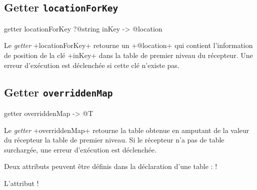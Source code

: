 \subsection{Getter \texttt{locationForKey}}

\begin{galgas}
getter locationForKey ?@string inKey -> @location
\end{galgas}


Le \emph{getter} \ggs+locationForKey+ retourne un \ggs+@location+ qui contient l'information de position de la clé \ggs+inKey+ dans la table de premier niveau du récepteur. Une erreur d'exécution est déclenchée si cette clé n'existe pas.








\subsection{Getter \texttt{overriddenMap}}

\begin{galgas}
getter overriddenMap -> @T
\end{galgas}


Le \emph{getter} \ggs+overriddenMap+ retourne la table obtenue en amputant de la valeur du récepteur la table de premier niveau. Si le récepteur n'a pas de table surchargée, une erreur d'exécution est déclenchée.










Deux attributs peuvent être définis dans la déclaration d'une table : \ggs!%

L'attribut \ggs!%



